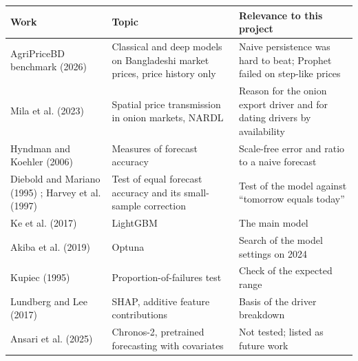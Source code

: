 \begin{tabular}{p{2.6cm}p{3.6cm}p{5.2cm}}
\toprule
\textbf{Work} & \textbf{Topic} & \textbf{Relevance to this project} \\
\midrule
AgriPriceBD benchmark (2026) \cite{agripricebd} & Classical and deep models on Bangladeshi market prices, price history only & Naive persistence was hard to beat; Prophet failed on step-like prices \\
Mila et al. (2023) \cite{onionnardl} & Spatial price transmission in onion markets, NARDL & Reason for the onion export driver and for dating drivers by availability \\
Hyndman and Koehler (2006) \cite{hk2006} & Measures of forecast accuracy & Scale-free error and ratio to a naive forecast \\
Diebold and Mariano (1995) \cite{dm1995}; Harvey et al. (1997) \cite{hln1997} & Test of equal forecast accuracy and its small-sample correction & Test of the model against ``tomorrow equals today'' \\
Ke et al. (2017) \cite{lightgbm} & LightGBM & The main model \\
Akiba et al. (2019) \cite{optuna} & Optuna & Search of the model settings on 2024 \\
Kupiec (1995) \cite{kupiec} & Proportion-of-failures test & Check of the expected range \\
Lundberg and Lee (2017) \cite{shap} & SHAP, additive feature contributions & Basis of the driver breakdown \\
Ansari et al. (2025) \cite{chronos2} & Chronos-2, pretrained forecasting with covariates & Not tested; listed as future work \\
\bottomrule
\end{tabular}
